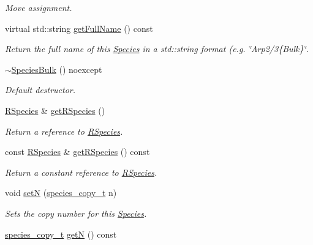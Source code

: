 \begin{DoxyCompactItemize}
\begin{DoxyCompactList}\small\item\em Move assignment. \end{DoxyCompactList}\item 
virtual std\-::string \hyperlink{classchem_1_1SpeciesBulk_a340d3f16e075352bf1cbab7918f5ca20}{get\-Full\-Name} () const 
\begin{DoxyCompactList}\small\item\em Return the full name of this \hyperlink{classchem_1_1Species}{Species} in a std\-::string format (e.\-g. \char`\"{}\-Arp2/3\{\-Bulk\}\char`\"{}. \end{DoxyCompactList}\item 
\hyperlink{classchem_1_1SpeciesBulk_ae9f7976efc0117e213b1a616e1216d5d}{$\sim$\-Species\-Bulk} () noexcept
\begin{DoxyCompactList}\small\item\em Default destructor. \end{DoxyCompactList}\item 
\hyperlink{classchem_1_1RSpecies}{R\-Species} \& \hyperlink{classchem_1_1Species_a1719a8155a69e9a62593d23d4bfc8514}{get\-R\-Species} ()
\begin{DoxyCompactList}\small\item\em Return a reference to \hyperlink{classchem_1_1RSpecies}{R\-Species}. \end{DoxyCompactList}\item 
const \hyperlink{classchem_1_1RSpecies}{R\-Species} \& \hyperlink{classchem_1_1Species_a438dae186317809effdd040ed38c568b}{get\-R\-Species} () const 
\begin{DoxyCompactList}\small\item\em Return a constant reference to \hyperlink{classchem_1_1RSpecies}{R\-Species}. \end{DoxyCompactList}\item 
void \hyperlink{classchem_1_1Species_af10a33a212fdb986fb93613e9c219f7a}{set\-N} (\hyperlink{common_8h_a3503f321fd36304ee274141275cca586}{species\-\_\-copy\-\_\-t} n)
\begin{DoxyCompactList}\small\item\em Sets the copy number for this \hyperlink{classchem_1_1Species}{Species}. \end{DoxyCompactList}\item 
\hyperlink{common_8h_a3503f321fd36304ee274141275cca586}{species\-\_\-copy\-\_\-t} \hyperlink{classchem_1_1Species_af7c9f51060b84169b428a7796dad6dca}{get\-N} () const 

\end{DoxyCompactItemize}
